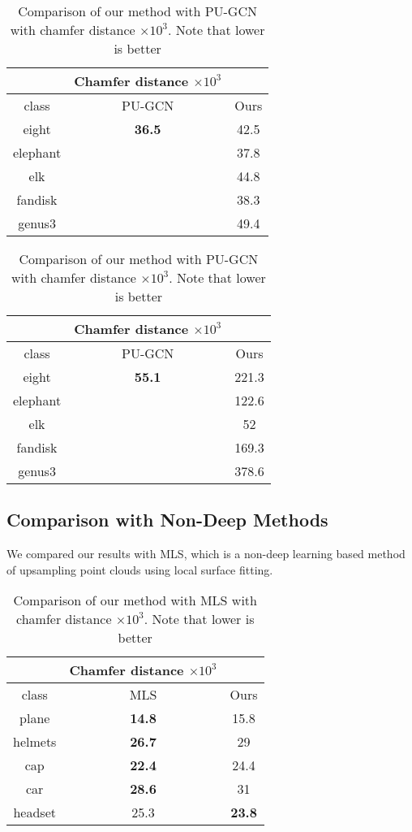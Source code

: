 \begin{table}[H]
\centering
\begin{tabular}{ccc}
	& Chamfer distance $\times 10^3$ &\\
	\hline
	class & PU-GCN & Ours \\
	\hline
	eight & \textbf{36.5} & {42.5} \\ 
	elephant & {} & {37.8} \\
	elk & {} & {44.8} \\  
	fandisk & {} & {38.3} \\  
	genus3 & {} & {49.4}  \\
\end{tabular}
\caption{Comparison of our method with PU-GCN with chamfer distance $\times 10^3$. Note that lower is better}
\end{table}


\begin{table}[H]
\centering
\begin{tabular}{ccc}
	& Chamfer distance $\times 10^3$ &\\
	\hline
	class & PU-GCN & Ours \\
	\hline
	eight & \textbf{55.1} & {221.3} \\ 
	elephant &  \textbf{}& {122.6} \\
	elk & {} & {52} \\  
	fandisk & {} & {169.3} \\  
	genus3 & {} & {378.6}  \\
\end{tabular}
\caption{Comparison of our method with PU-GCN with chamfer distance $\times 10^3$. Note that lower is better}
\end{table}

\subsection{Comparison with Non-Deep Methods}

We compared our results with MLS, which is a non-deep learning based method of upsampling point clouds using local surface fitting.

\begin{table}[H]
\centering
\begin{tabular}{ccc}
	& Chamfer distance $\times 10^3$ &\\
	\hline
	class & MLS & Ours \\
	\hline
	plane & \textbf{14.8} & 15.8 \\ 
	helmets & \textbf{26.7} & 29 \\
	cap & \textbf{22.4} & 24.4 \\  
	car & \textbf{28.6} & 31 \\  
	headset & {25.3} & \textbf{23.8}  \\
\end{tabular}
\caption{Comparison of our method with MLS with chamfer distance $\times 10^3$. Note that lower is better}
\end{table}

